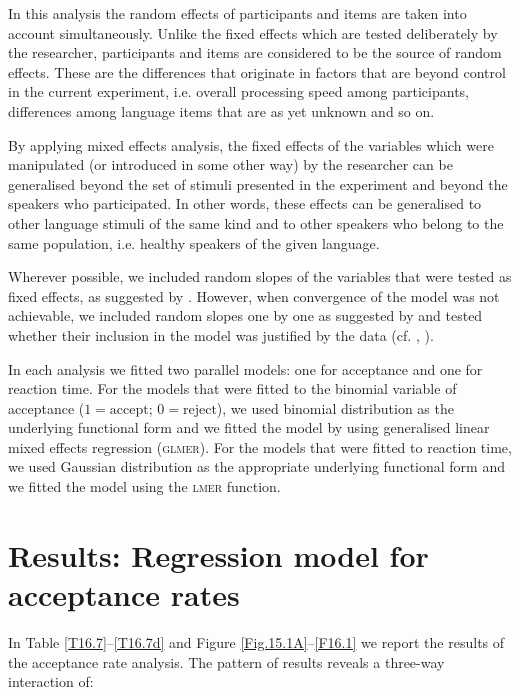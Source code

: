 In this analysis the random effects of participants and items are taken into account simultaneously. Unlike the fixed effects which are tested deliberately by the researcher, participants and items are considered to be the source of random effects. These are the differences that originate in factors that are beyond control in the current experiment, i.e. overall processing speed among participants, differences among language items that are as yet unknown and so on. 

By applying mixed effects analysis, the fixed effects of the variables which were manipulated (or introduced in some other way) by the researcher can be generalised beyond the set of stimuli presented in the experiment and beyond the speakers who participated. In other words, these effects can be generalised to other language stimuli of the same kind and to other speakers who belong to the same population, i.e. healthy speakers of the given language. 

\begin{sloppypar}
Wherever possible, we included random slopes of the variables that were tested as fixed effects, as suggested by \citet[][]{BLST13}. However, when convergence of the model was not achievable, we included random slopes one by one as suggested by \citet[][]{Barr13} and tested whether their inclusion in the model was justified by the data (cf. \citealt*{BKVB15}, \citealt[][]{MKVBB17}).\end{sloppypar}

In each analysis we fitted two parallel models: one for acceptance and one for reaction time. For the models that were fitted to the binomial variable of acceptance ($1=\text{accept}$; $0=\text{reject}$), we used binomial distribution as the underlying functional form and we fitted the model by using generalised linear mixed effects regression (\textsc{glmer}). For the models that were fitted to reaction time, we used Gaussian distribution as the appropriate underlying functional form and we fitted the model using the \textsc{lmer} function. 

\section{Results: Regression model for acceptance rates}
\label{Results:16}
\label{Regression model for acceptance rates}

In Table \ref{T16.7}--\ref{T16.7d} and Figure \ref{Fig.15.1A}--\ref{F16.1} we report the results of the acceptance rate analysis. The pattern of results reveals a three-way interaction of: 

